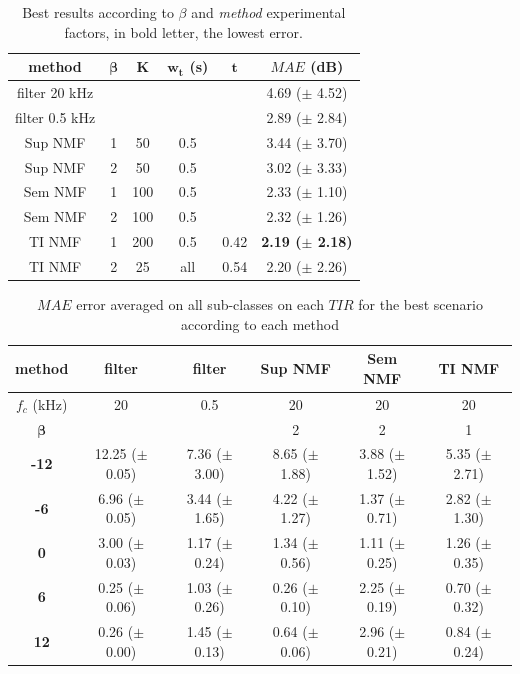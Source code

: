 \documentclass[twocolumn,a4paper,10pt]{article}
\begin{document}
\begin{table}[t]
\centering
\begin{tabular}{@{}cccccc@{}}
\toprule
\textbf{method} & $\mathbf{\beta}$ & $\mathbf{K}$ & $\mathbf{w_t}$ (s) &   $\mathbf{t}$ & \textbf{$MAE$ (dB)} \\ \midrule
filter 20 kHz &  &  &  &  & 4.69 ($\pm$ 4.52) \\
filter 0.5 kHz&  &   &  &  & 2.89 ($\pm$ 2.84) \\ \hline \hline
Sup NMF &  1 & 50 & 0.5  &  & 3.44 ($\pm$ 3.70) \\
Sup NMF &  2 & 50 & 0.5  &   & 3.02 ($\pm$ 3.33) \\ \hline \hline
Sem NMF &  1 & 100 & 0.5 &   & 2.33 ($\pm$ 1.10) \\
Sem NMF &  2 & 100 & 0.5 &   & 2.32 ($\pm$ 1.26) \\ \hline \hline
TI NMF &  1 & 200 & 0.5 &  0.42 &\textbf{2.19 ($\pm$ 2.18)} \\
TI NMF &  2 & 25 & all &  0.54 & 2.20 ($\pm$ 2.26)\\ \bottomrule
\end{tabular}
\caption{Best results according to $\beta$ and \textit{method} experimental factors, in bold letter, the lowest error.}
\label{tab:results}
\end{table}

\begin{table}[t]
\centering
\begin{tabular}{@{}cccccc@{}}
\toprule
\textbf{method} & filter & filter & Sup NMF & Sem NMF & TI NMF \\ \midrule
$f_c$ (kHz) & 20 & 0.5 & 20 & 20 & 20 \\
$\mathbf{\beta}$ &  &  & 2 & 2 & 1 \\ \hline
\textbf{-12} & 12.25 ($\pm$ 0.05) & 7.36 ($\pm$ 3.00) & 8.65 ($\pm$ 1.88) & 3.88 ($\pm$ 1.52) & 5.35 ($\pm$ 2.71) \\
\textbf{-6} & 6.96 ($\pm$ 0.05) & 3.44 ($\pm$ 1.65) & 4.22 ($\pm$ 1.27) & 1.37 ($\pm$ 0.71)  & 2.82 ($\pm$ 1.30) \\
\textbf{0} & 3.00 ($\pm$ 0.03) & 1.17 ($\pm$ 0.24) & 1.34 ($\pm$ 0.56) & 1.11 ($\pm$ 0.25) & 1.26 ($\pm$ 0.35) \\
\textbf{6} & 0.25 ($\pm$ 0.06) & 1.03 ($\pm$ 0.26) & 0.26 ($\pm$ 0.10) & 2.25 ($\pm$ 0.19) & 0.70 ($\pm$ 0.32) \\
\textbf{12} & 0.26 ($\pm$ 0.00) & 1.45 ($\pm$ 0.13) & 0.64 ($\pm$ 0.06) & 2.96 ($\pm$ 0.21)  & 0.84 ($\pm$ 0.24) \\ \bottomrule
\end{tabular}
\caption{$MAE$ error averaged on all sub-classes on each $TIR$ for the best scenario according to each method}
\label{tab:results_TIR}
\end{table}
\end{document}
